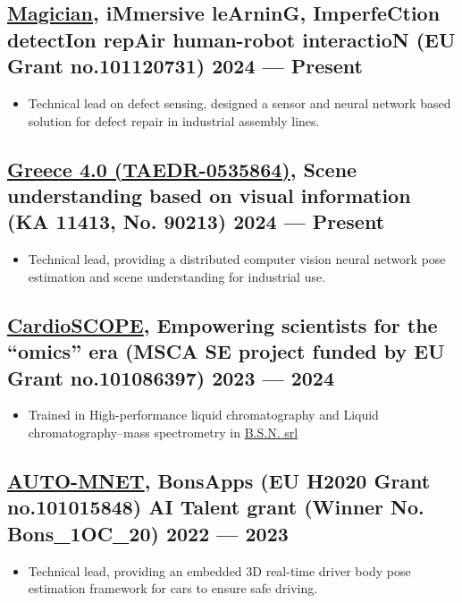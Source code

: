 \documentclass[a4,8pt]{article}
\newenvironment{zitemize}{
\begin{itemize}\itemsep0pt \parskip0pt \parsep1pt}
{\end{itemize}\vspace{-0.5cm}}
\begin{document}
\subsection*{\href{https://cordis.europa.eu/project/id/101120731}{Magician}, {\normalsize\normalfont iMmersive leArninG, ImperfeCtion detectIon repAir  human-robot interactioN (EU Grant no.101120731)} \hfill 2024 --- Present } 
    \begin{zitemize}
        \item Technical lead on defect sensing, designed a sensor and neural network based solution for defect repair in industrial assembly lines.
    \end{zitemize}

\subsection*{\href{https://www.greece40.gr/}{Greece 4.0 (TAEDR-0535864)}, {\normalsize\normalfont Scene understanding based on visual information (KA 11413, No. 90213)} \hfill 2024 --- Present } 
    \begin{zitemize}
        \item Technical lead, providing a distributed computer vision neural network pose estimation and scene understanding for industrial use.
    \end{zitemize}

\subsection*{\href{https://cardio-scope.eu/}{CardioSCOPE}, {\normalsize\normalfont Empowering scientists for the “omics” era (MSCA SE project funded by EU Grant no.101086397)} \hfill 2023 --- 2024 } 
    \begin{zitemize}
            \item Trained in High-performance liquid chromatography and Liquid chromatography–mass spectrometry in \href{https://www.bsn-srl.it/en/}{B.S.N. srl} 
    \end{zitemize}

\subsection*{\href{https://gitlab.com/bonseyes/bonsapps/1st-support-programme/automotive/body-part-tracking/auto-mnet}{AUTO-MNET}, {\normalsize\normalfont BonsApps (EU H2020 Grant no.101015848) AI Talent grant (Winner No. Bons\_1OC\_20)} \hfill 2022 --- 2023 } 
    \begin{zitemize}
        \item Technical lead, providing an embedded 3D real-time driver body pose estimation framework for cars to ensure safe driving.  
    \end{zitemize}
\end{document}

